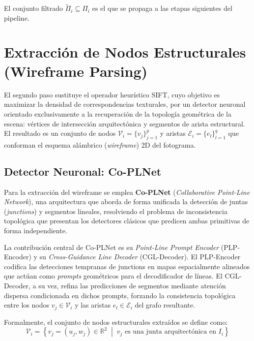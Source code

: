 El conjunto filtrado $\tilde{\Pi}_i \subseteq \Pi_i$ es el que se propaga a las etapas siguientes del pipeline.

\section{Extracción de Nodos Estructurales (Wireframe Parsing)}

El segundo paso sustituye el operador heurístico SIFT, cuyo objetivo es maximizar la densidad de correspondencias texturales, por un detector neuronal orientado exclusivamente a la recuperación de la topología geométrica de la escena: vértices de intersección arquitectónica y segmentos de arista estructural. El resultado es un conjunto de nodos $\mathcal{V}_i = \{v_j\}_{j=1}^{p}$ y aristas $\mathcal{E}_i = \{e_l\}_{l=1}^{q}$ que conforman el esquema alámbrico (\textit{wireframe}) 2D del fotograma.
 
\subsection{Detector Neuronal: Co-PLNet}
 
Para la extracción del wireframe se emplea \textbf{Co-PLNet} \cite{wang2026coplnet} (\textit{Collaborative Point-Line Network}), una arquitectura que aborda de forma unificada la detección de juntas (\textit{junctions}) y segmentos lineales, resolviendo el problema de inconsistencia topológica que presentan los detectores clásicos que predicen ambas primitivas de forma independiente.
 
La contribución central de Co-PLNet es su \textit{Point-Line Prompt Encoder} (PLP-Encoder) y su \textit{Cross-Guidance Line Decoder} (CGL-Decoder). El PLP-Encoder codifica las detecciones tempranas de junctions en mapas espacialmente alineados que actúan como \textit{prompts} geométricos para el decodificador de líneas. El CGL-Decoder, a su vez, refina las predicciones de segmentos mediante atención dispersa condicionada en dichos prompts, forzando la consistencia topológica entre los nodos $v_j \in \mathcal{V}_i$ y las aristas $e_l \in \mathcal{E}_i$ del grafo resultante.
 
Formalmente, el conjunto de nodos estructurales extraídos se define como:
\begin{equation}
    \mathcal{V}_i = \left\{ v_j = (u_j, w_j) \in \mathbb{R}^2 \;\middle|\; v_j \text{ es una junta arquitectónica en } I_i \right\}
\end{equation}
 
